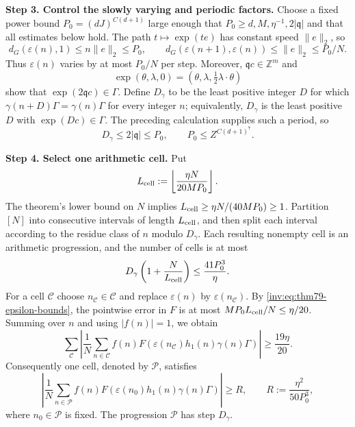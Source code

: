 \documentclass[twoside]{aomart}
\makeatletter
\theoremstyle{paperplain}
\theoremstyle{paperdefinition}
\renewenvironment{proof}[1][\proofname]{\par\pushQED{\qed}%
  \normalfont\topsep6\p@\@plus3\p@\relax\trivlist
  \item[\hskip\labelsep\itshape #1\@addpunct{.}]\ignorespaces
}{\popQED\endtrivlist\@endpefalse}
\numberwithin{equation}{section}
\makeatother
\begin{document}
\begin{proof}
\par
\medskip
\noindent\textbf{Step 3. Control the slowly varying and periodic factors.}
Choose a fixed power bound $P_0=(dJ)^{C(d+1)}$ large enough that
$P_0\ge d,M,\eta^{-1},2|\mathfrak q|$ and that all estimates below hold.
The path $t\mapsto\exp(te)$ has constant speed $\|e\|_2$, so
\begin{equation}
 d_G(\varepsilon(n),1)\le n\|e\|_2\le P_0,
 \qquad
 d_G(\varepsilon(n+1),\varepsilon(n))\le\|e\|_2\le P_0/N.
 \label{inv:eq:thm79-epsilon-bounds}
\end{equation}
Thus $\varepsilon(n)$ varies by at most $P_0/N$ per step.  Moreover,
$\mathfrak q c\in\mathbb Z^m$ and
\[
 \exp(\theta,\lambda,0)
   =(\theta,\lambda,\tfrac12\lambda\cdot\theta)
\]
show that $\exp(2\mathfrak q c)\in\Gamma$.  Define
$D_\gamma$ to be the least positive integer $D$ for which
$\gamma(n+D)\Gamma=\gamma(n)\Gamma$ for every integer $n$; equivalently,
$D_\gamma$ is the least positive $D$ with $\exp(Dc)\in\Gamma$.
The preceding calculation supplies such a period, so
\begin{equation}
 D_\gamma\le2|\mathfrak q|\le P_0,
 \qquad P_0\le Z^{C(d+1)^7}.
 \label{inv:eq:thm79-gamma-period}
\end{equation}

\par
\medskip
\noindent\textbf{Step 4. Select one arithmetic cell.}
Put
\[
 L_{\rm cell}:=\left\lfloor\frac{\eta N}{20MP_0}\right\rfloor.
\]
The theorem's lower bound on $N$ implies
$L_{\rm cell}\ge\eta N/(40MP_0)\ge1$.  Partition $[N]$ into consecutive
intervals of length $L_{\rm cell}$, and then split each interval according
to the residue class of $n$ modulo $D_\gamma$.  Each resulting nonempty
cell is an arithmetic progression, and the number of cells is at most
\begin{equation*}
 D_\gamma\left(1+\frac{N}{L_{\rm cell}}\right)
 \le\frac{41P_0^3}{\eta}.
\end{equation*}
For a cell $\mathcal C$ choose $n_\mathcal C\in\mathcal C$ and replace
$\varepsilon(n)$ by $\varepsilon(n_\mathcal C)$.  By
\eqref{inv:eq:thm79-epsilon-bounds}, the pointwise error in $F$ is at most
$MP_0L_{\rm cell}/N\le\eta/20$.  Summing over $n$ and using $|f(n)|=1$,
we obtain
\begin{equation*}
 \sum_{\mathcal C}
 \left|\frac1N\sum_{n\in\mathcal C}
 f(n)F(\varepsilon(n_\mathcal C)h_1(n)\gamma(n)\Gamma)\right|
 \ge\frac{19\eta}{20}.
\end{equation*}
Consequently one cell, denoted by $\mathcal P$, satisfies
\begin{equation*}
 \left|\frac1N\sum_{n\in\mathcal P}
 f(n)F(\varepsilon(n_0)h_1(n)\gamma(n)\Gamma)\right|
 \ge R,
 \qquad R:=\frac{\eta^2}{50P_0^3},
\end{equation*}
where $n_0\in\mathcal P$ is fixed.  The progression $\mathcal P$ has step
$D_\gamma$.


\end{proof}
\end{document}
